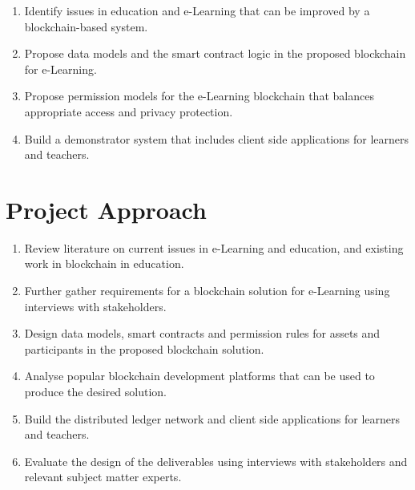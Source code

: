 \begin{enumerate}
    \item Identify issues in education and e-Learning that can be improved by a blockchain-based system.
    \item Propose data models and the smart contract logic in the proposed blockchain for e-Learning.
    \item Propose permission models for the e-Learning blockchain that balances appropriate access and privacy protection.
    \item Build a demonstrator system that includes client side applications for learners and teachers.
\end{enumerate}



\section{Project Approach} %

\begin{enumerate}
    \item Review literature on current issues in e-Learning and education, and existing work in blockchain in education.
    \item Further gather requirements for a blockchain solution for e-Learning using interviews with stakeholders.
    \item Design data models, smart contracts and permission rules for assets and participants in the proposed blockchain solution.
    \item Analyse popular blockchain development platforms that can be used to produce the desired solution.
    \item Build the distributed ledger network and client side applications for learners and teachers.
    \item Evaluate the design of the deliverables using interviews with stakeholders and relevant subject matter experts.
\end{enumerate}

